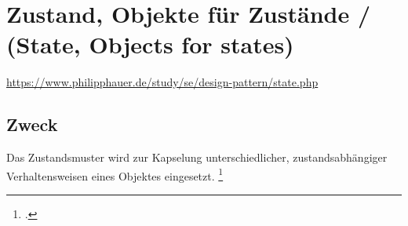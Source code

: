 \documentclass{bschlangaul-haupt}
\begin{document}

\chapter{Zustand, Objekte für Zustände / (State, Objects for states)}

\begin{liQuellen}
\item \cite{wiki:zustand}
\item \url{https://www.philipphauer.de/study/se/design-pattern/state.php}
\item \cite[PDF Seite 258-265]{gof}
\item \cite[Seite 69-81]{siebler}
\end{liQuellen}

\section{Zweck}

Das Zustandsmuster wird zur Kapselung unterschiedlicher,
zustandsabhängiger Verhaltensweisen eines Objektes eingesetzt.
\footcite{wiki:zustand}

\liEntwurfsZustand

\literatur
\end{document}

